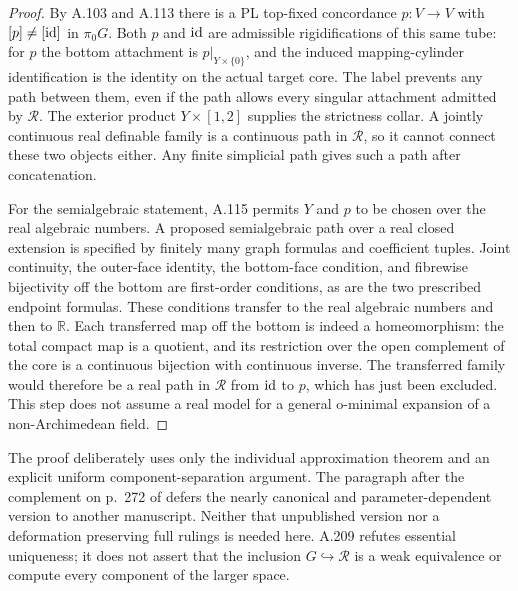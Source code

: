 \begin{proof}
By A.103 and A.113 there is a PL top-fixed concordance
$p:V\to V$ with $[p]\ne[\operatorname{id}]$ in $\pi_0G$.
Both $p$ and $\operatorname{id}$ are admissible rigidifications of this same tube:
for $p$ the bottom attachment is $p|_{Y\times\{0\}}$, and the
induced mapping-cylinder identification is the identity on the
actual target core. The label prevents any path between them,
even if the path allows every singular attachment admitted by
$\mathcal R$. The exterior product $Y\times[1,2]$ supplies the
strictness collar. A jointly continuous real definable family is a
continuous path in $\mathcal R$, so it cannot connect these two
objects either. Any finite simplicial path gives such a path after
concatenation.

For the semialgebraic statement, A.115 permits $Y$ and $p$ to be
chosen over the real algebraic numbers. A proposed semialgebraic
path over a real closed extension is specified by finitely many
graph formulas and coefficient tuples. Joint continuity, the
outer-face identity, the bottom-face condition, and fibrewise
bijectivity off the bottom are first-order conditions, as are the
two prescribed endpoint formulas. These conditions transfer to the
real algebraic numbers and then to $\mathbb R$. Each transferred
map off the bottom is indeed a homeomorphism: the total compact
map is a quotient, and its restriction over the open complement of
the core is a continuous bijection with continuous inverse.
The transferred family would therefore be a real path in
$\mathcal R$ from $\operatorname{id}$ to $p$, which has just been excluded.
This step does not assume a real model for a general o-minimal
expansion of a non-Archimedean field.
\end{proof}

The proof deliberately uses only the individual approximation theorem
and an explicit uniform component-separation argument. The paragraph
after the complement on p.~272 of
\cite{Siebenmann1972Approximation} defers the nearly canonical and
parameter-dependent version to another manuscript. Neither that
unpublished version nor a deformation preserving full rulings is
needed here. A.209 refutes essential uniqueness; it does not assert
that the inclusion $G\hookrightarrow\mathcal R$ is a weak equivalence
or compute every component of the larger space.

